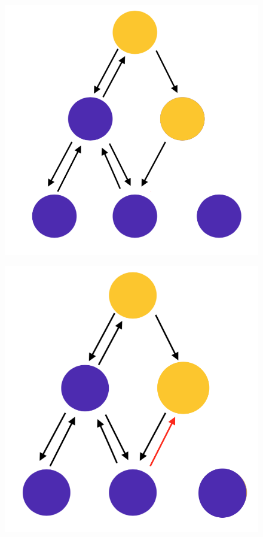 \documentclass[10pt,a4paper]{article}
\begin{document}
\begin{figure}[h!]
\centering
\begin{minipage}{.3\textwidth}
  \includegraphics[width=.8\linewidth]{images/di-sch7.png}
  \label{fig:di-sch7}
\end{minipage}%
\begin{minipage}{.3\textwidth}
  \includegraphics[width=.8\linewidth]{images/di-sch8.png}
  \label{fig:di-sch8}
\end{minipage}%
\begin{minipage}{.3\textwidth}

\end{minipage}
\end{figure}
\end{document}
